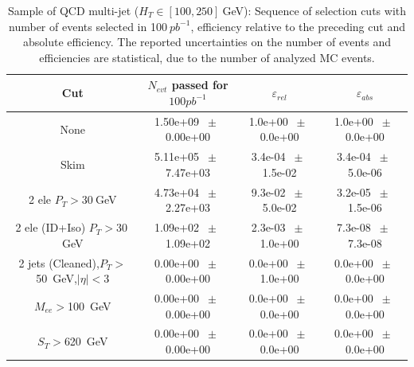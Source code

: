 \begin{table}[htbp] 
\begin{center} 
\begin{tabular}{|c|c|c|c|} 
\hline\hline 
 Cut & $N_{evt}$ passed for $100pb^{-1}$ & $\varepsilon_{rel}$ & $\varepsilon_{abs}$ \\ 
\hline\hline 
None       &        1.50e+09       $~\pm~$       0.00e+00        &        1.0e+00       $~\pm~$       0.0e+00        &        1.0e+00       $~\pm~$       0.0e+00       \\       
       Skim       &        5.11e+05       $~\pm~$       7.47e+03        &        3.4e-04       $~\pm~$       1.5e-02        &        3.4e-04       $~\pm~$       5.0e-06       \\       
       2 ele $P_T>30~$GeV       &        4.73e+04       $~\pm~$       2.27e+03        &        9.3e-02       $~\pm~$       5.0e-02        &        3.2e-05       $~\pm~$       1.5e-06       \\       
       2 ele (ID+Iso) $P_T>30~$GeV       &        1.09e+02       $~\pm~$       1.09e+02        &        2.3e-03       $~\pm~$       1.0e+00        &        7.3e-08       $~\pm~$       7.3e-08       \\       
       2 jets (Cleaned),$P_T>$50~GeV,$|\eta|<$3       &        0.00e+00       $~\pm~$       0.00e+00        &        0.0e+00       $~\pm~$       1.0e+00        &        0.0e+00       $~\pm~$       0.0e+00       \\       
       $M_{ee}>$100~GeV       &        0.00e+00       $~\pm~$       0.00e+00        &        0.0e+00       $~\pm~$       0.0e+00        &        0.0e+00       $~\pm~$       0.0e+00       \\       
       $S_T>$620~GeV       &        0.00e+00       $~\pm~$       0.00e+00        &        0.0e+00       $~\pm~$       0.0e+00        &        0.0e+00       $~\pm~$       0.0e+00       \\       
       \hline\hline 
\end{tabular} 
\end{center} 
\caption{Sample of QCD multi-jet ($H_T \in [100,250]~$GeV): Sequence of selection cuts with number of events selected in 100$~pb^{-1}$, efficiency relative to the preceding cut and absolute efficiency. The reported uncertainties on the number of events and efficiencies are statistical, due to the number of analyzed MC events.} 
\label{tab:effic-QCD-100-250} 
\end{table} 

